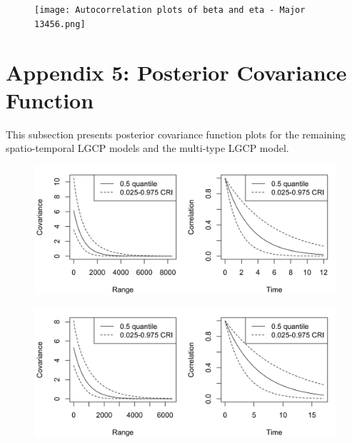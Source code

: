 \documentclass[12pt,a4paper]{report}
\begin{document}
\begin{figure}[H]
\begin{center}
\texttt{[image: Autocorrelation plots of beta and eta - Major 13456.png]}
\end{center}
\end{figure}

\newpage

\section*{Appendix 5: Posterior Covariance Function}

This subsection presents posterior covariance function plots for the remaining spatio-temporal LGCP models and the multi-type LGCP model.

\begin{figure}[H]
\begin{center}
\includegraphics[width=\linewidth]{Posterior Covariance Function - Major 2.png}
\end{center}
\end{figure}

\begin{figure}[H]
\begin{center}
\includegraphics[width=\linewidth]{Posterior Covariance Function - Major 13456.png}
\end{center}
\end{figure}
\end{document}
